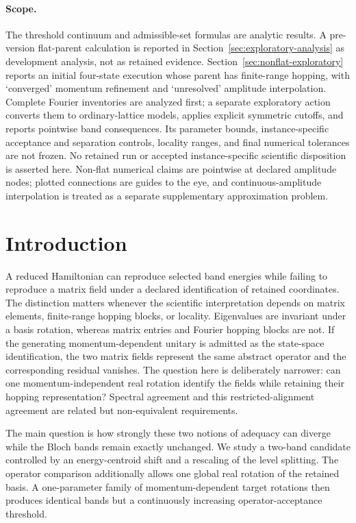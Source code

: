 \documentclass[11pt]{article}
\begin{document}
\paragraph{Scope.}
The threshold continuum and admissible-set formulas are analytic results. A pre-version
flat-parent calculation is reported in Section~\ref{sec:exploratory-analysis} as
development analysis, not as retained evidence. Section~\ref{sec:nonflat-exploratory}
reports an initial four-state execution whose parent has finite-range hopping, with
`converged' momentum refinement and `unresolved' amplitude interpolation. Complete
Fourier inventories are analyzed first; a separate exploratory action converts them to
ordinary-lattice models, applies explicit symmetric cutoffs, and reports pointwise band
consequences. Its parameter bounds, instance-specific
acceptance and separation
controls, locality ranges, and final numerical tolerances are not frozen. No retained
run or accepted instance-specific scientific disposition is asserted here. Non-flat
numerical claims are pointwise at declared amplitude nodes; plotted connections are
guides to the eye, and continuous-amplitude interpolation is treated as a separate
supplementary approximation problem.

\section{Introduction}

A reduced Hamiltonian can reproduce selected band energies while failing to reproduce
a matrix field under a declared identification of retained coordinates. The distinction
matters whenever the scientific interpretation depends on matrix elements, finite-range
hopping blocks, or locality. Eigenvalues are invariant under a basis rotation, whereas
matrix entries and Fourier hopping blocks are not. If the generating momentum-dependent
unitary is admitted as the state-space identification, the two matrix fields represent
the same abstract operator and the corresponding residual vanishes. The question here
is deliberately narrower: can one momentum-independent real rotation identify the
fields while retaining their hopping representation? Spectral agreement and this
restricted-alignment agreement are related but non-equivalent requirements.

The main question is how strongly these two notions of adequacy can diverge while the
Bloch bands remain exactly unchanged. We study a two-band candidate controlled by an
energy-centroid shift and a rescaling of the level splitting. The operator comparison
additionally allows one global real rotation of the retained basis. A one-parameter
family of momentum-dependent target rotations then produces identical bands but a
continuously increasing operator-acceptance threshold.
\end{document}
